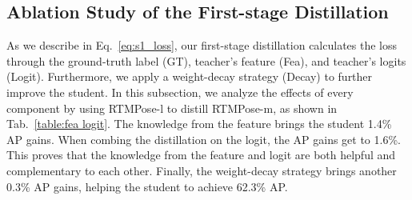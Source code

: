 \documentclass[10pt,twocolumn,letterpaper]{article}
\begin{document}
\begin{table}
  \centering
  \vspace{0.1cm}
  \caption{The impact of the proposed head-aware self-KD in the second-stage distillation (S2) on existing estimator RTMPose. `*' denotes the model is trained on COCO + UBody. All results are reported with AP on COCO-WholeBody.}
  \label{table:second dis}
\vspace{-0.3cm}
\end{table}

\subsection{Ablation Study of the First-stage Distillation}
As we describe in Eq.~\ref{eq:s1_loss}, our first-stage distillation calculates the loss through the ground-truth label (GT), teacher's feature (Fea), and teacher's logits (Logit). Furthermore, we apply a weight-decay strategy (Decay) to further improve the student. In this subsection, we analyze the effects of every component by using RTMPose-l to distill RTMPose-m, as shown in Tab.~\ref{table:fea logit}. The knowledge from the feature brings the student 1.4\% AP gains. When combing the distillation on the logit, the AP gains get to 1.6\%. This proves that the knowledge from the feature and logit are both helpful and complementary to each other. Finally, the weight-decay strategy brings another 0.3\% AP gains, helping the student to achieve 62.3\% AP.
\end{document}
